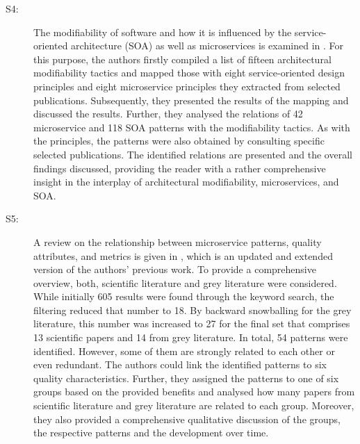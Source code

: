 \documentclass{bmcart}
\begin{document}
\begin{description}
  \item[S4:] The modifiability of software and how it is influenced by the service-oriented architecture (SOA) as well as microservices is examined in \cite{Bogner.2019}. For this purpose, the authors firstly compiled a list of fifteen architectural modifiability tactics and mapped those with eight service-oriented design principles and eight microservice principles they extracted from selected publications. Subsequently, they presented the results of the mapping and discussed the results. Further, they analysed the relations of 42 microservice and 118 SOA patterns with the modifiability tactics. As with the principles, the patterns were also obtained by consulting specific selected publications. The identified relations are presented and the overall findings discussed, providing the reader with a rather comprehensive insight in the interplay of architectural modifiability, microservices, and SOA.
  \item[S5:] A review on the relationship between microservice patterns, quality attributes, and metrics is given in \cite{Valdivia.2020}, which is an updated and extended version of the authors' previous work. To provide a comprehensive overview, both, scientific literature and grey literature were considered. While initially 605 results were found through the keyword search, the filtering reduced that number to 18. By backward snowballing for the grey literature, this number was increased to 27 for the final set that comprises 13 scientific papers and 14 from grey literature. In total, 54 patterns were identified. However, some of them are strongly related to each other or even redundant. The authors could link the identified patterns to six quality characteristics. Further, they assigned the patterns to one of six groups based on the provided benefits and analysed how many papers from scientific literature and grey literature are related to each group. Moreover, they also provided a comprehensive qualitative discussion of the groups, the respective patterns and the development over time.

\end{description}
\end{document}
